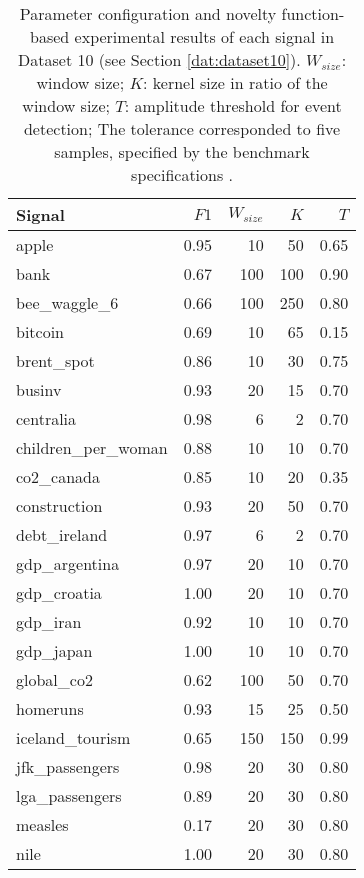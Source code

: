 \begin{table}
\centering
    \caption{Parameter configuration and novelty function-based experimental results of each signal in Dataset 10 (see Section \ref{dat:dataset10}). $W_{size}$: window size; $K$: kernel size in ratio of the window size; $T$: amplitude threshold for event detection; The tolerance corresponded to five samples, specified by the benchmark specifications \cite{cpd_alan}.}
    \label{tab:params_results_alanT}
    \begin{tabular}{lrrrr}
    \toprule
    Signal &     $F1$ &    $W_{size}$ &    $K$ &     $T$\\
    \midrule
    apple &  0.95 &   10 &   50 &  0.65 \\
    bank &  0.67 &  100 &  100 &  0.90 \\
    bee\_waggle\_6 &  0.66 &  100 &  250 &  0.80 \\
    bitcoin &  0.69 &   10 &   65 &  0.15 \\
    brent\_spot &  0.86 &   10 &   30 &  0.75 \\
    businv &  0.93 &   20 &   15 &  0.70 \\
    centralia &  0.98 &    6 &    2 &  0.70 \\
    children\_per\_woman &  0.88 &   10 &   10 &  0.70 \\
    co2\_canada &  0.85 &   10 &   20 &  0.35 \\
    construction &  0.93 &   20 &   50 &  0.70 \\
    debt\_ireland &  0.97 &    6 &    2 &  0.70 \\
    gdp\_argentina &  0.97 &   20 &   10 &  0.70 \\
    gdp\_croatia &  1.00 &   20 &   10 &  0.70 \\
    gdp\_iran &  0.92 &   10 &   10 &  0.70 \\
    gdp\_japan &  1.00 &   10 &   10 &  0.70 \\
    global\_co2 &  0.62 &  100 &   50 &  0.70 \\
    homeruns &  0.93 &   15 &   25 &  0.50 \\
    iceland\_tourism &  0.65 &  150 &  150 &  0.99 \\
    jfk\_passengers &  0.98 &   20 &   30 &  0.80 \\
    lga\_passengers &  0.89 &   20 &   30 &  0.80 \\
    measles &  0.17 &   20 &   30 &  0.80 \\
    nile &  1.00 &   20 &   30 &  0.80 \\

\end{tabular}
\end{table}
